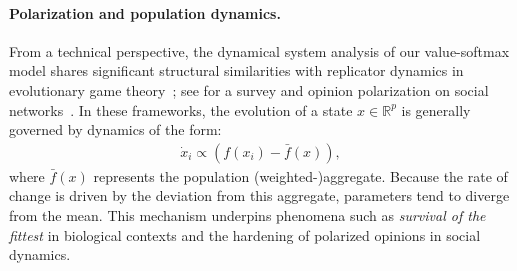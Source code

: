 \documentclass{article}
\theoremstyle{plain}
\theoremstyle{definition}
\theoremstyle{remark}
\begin{document}
\paragraph{Polarization and population dynamics.} From a technical perspective, the dynamical system analysis of our value-softmax model shares significant structural similarities with replicator dynamics in evolutionary game theory~\citep{taylor1978evolutionary, smith1982evolution}; see \citet{sorin2020replicator} for a survey and opinion polarization on social networks~\citep{proskurnikov2015opinion}. In these frameworks, the evolution of a state $x \in \mathbb{R}^{p}$ is generally governed by dynamics of the form:\begin{align*}\dot{x}_i \propto ( f(x_i) - \bar{f}(x) ),\end{align*}where $\bar{f}(x)$ represents the population (weighted-)aggregate. Because the rate of change is driven by the deviation from this aggregate, parameters tend to diverge from the mean. This mechanism underpins phenomena such as \emph{survival of the fittest} in biological contexts and the hardening of polarized opinions in social dynamics. 


%
\end{document}
